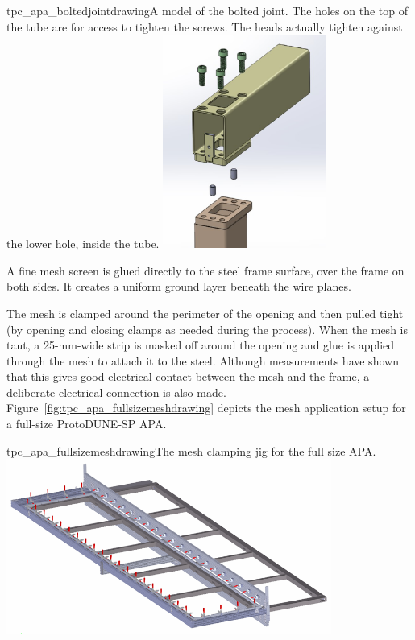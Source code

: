 \begin{cdrfigure}{tpc_apa_boltedjointdrawing}{A model of the bolted joint.  The holes on the top of the tube are for access to tighten the screws.  The heads actually tighten against the lower hole, inside the tube.}
\includegraphics[width=0.4\textwidth]{figures/tpc_apa_boltedjointdrawing.png} 
\end{cdrfigure}

A fine mesh screen is glued directly to the steel frame surface, over the frame on both sides.  It creates a uniform ground layer beneath the wire planes.  

The mesh is clamped around the perimeter of the opening and then pulled tight (by opening and closing clamps as needed during the process).  When the mesh is taut, a 25-mm-wide strip is masked off around the opening and glue is applied through the mesh to attach it to the steel.  Although measurements have shown that this gives good electrical contact between the mesh and the frame, a deliberate electrical connection is also made.  Figure~\ref{fig:tpc_apa_fullsizemeshdrawing} depicts the mesh application setup for a full-size ProtoDUNE-SP APA.

\begin{cdrfigure}{tpc_apa_fullsizemeshdrawing}{The mesh clamping jig for the full size APA. }
\includegraphics[width=0.8\textwidth]{figures/tpc_apa_fullsizemeshdrawing.png} 
\end{cdrfigure}

